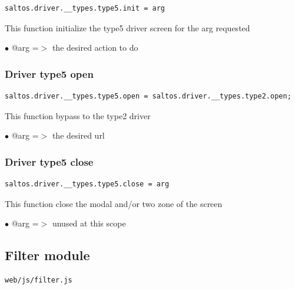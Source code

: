 \documentclass[a4paper]{article}
\begin{document}
\begin{lstlisting}
saltos.driver.__types.type5.init = arg
\end{lstlisting}

This function initialize the type5 driver screen for the arg requested

\begin{compactitem}
\item[\color{myblue}$\bullet$] @arg =$>$ the desired action to do
\end{compactitem}

\hypertarget{toc205}{}
\subsubsection{Driver type5 open}

\begin{lstlisting}
saltos.driver.__types.type5.open = saltos.driver.__types.type2.open;
\end{lstlisting}

This function bypass to the type2 driver

\begin{compactitem}
\item[\color{myblue}$\bullet$] @arg =$>$ the desired url
\end{compactitem}

\hypertarget{toc206}{}
\subsubsection{Driver type5 close}

\begin{lstlisting}
saltos.driver.__types.type5.close = arg
\end{lstlisting}

This function close the modal and/or two zone of the screen

\begin{compactitem}
\item[\color{myblue}$\bullet$] @arg =$>$ unused at this scope
\end{compactitem}

\hypertarget{toc207}{}
\subsection{Filter module}

\begin{lstlisting}
web/js/filter.js
\end{lstlisting}
\end{document}
